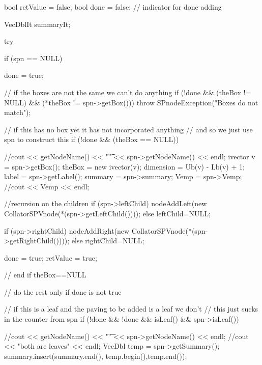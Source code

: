 \begin{DoxyCode}
    {
       
        bool retValue = false;
        bool done = false;  // indicator for done adding

        VecDblIt summaryIt;

        try {

            if (spn == NULL) {
                done = true;

            }

            // if the boxes are not the same we can't do anything
            if (!done && (theBox != NULL) && (*theBox != spn->getBox())) {
                throw SPnodeException("Boxes do not match");
            }

            // if this has no box yet it has not incorporated anything
            // and so we just use spn to construct this
            if (!done && (theBox == NULL)) {
                //cout << getNodeName() << "\t" << spn->getNodeName() << endl;
                ivector v = spn->getBox();
                theBox = new ivector(v);
                dimension = Ub(v) - Lb(v) + 1;
                label = spn->getLabel();
                summary = spn->summary;               
                Vemp = spn->Vemp;
                //cout << Vemp << endl;
                                
                //recursion on the children
                if (spn->leftChild) {
                    nodeAddLeft(new CollatorSPVnode(*(spn->getLeftChild())));
                }
                else leftChild=NULL;

                if (spn->rightChild) {
                    nodeAddRight(new CollatorSPVnode(*(spn->getRightChild())));
                 }
                else rightChild=NULL;

                done = true;
                retValue = true;
            } // end if theBox==NULL
            
            // do the rest only if done is not true

            // if this is a leaf and the paving to be added is a leaf we don't
            // this just sucks in the counter from spn
            if (!done && !done && isLeaf() && spn->isLeaf()) {
           //cout << getNodeName() << "\t" << spn->getNodeName() << endl;
                //cout << "both are leaves" << endl;
                VecDbl temp = spn->getSummary();
                summary.insert(summary.end(), temp.begin(),temp.end());
                
}}}
\end{DoxyCode}
